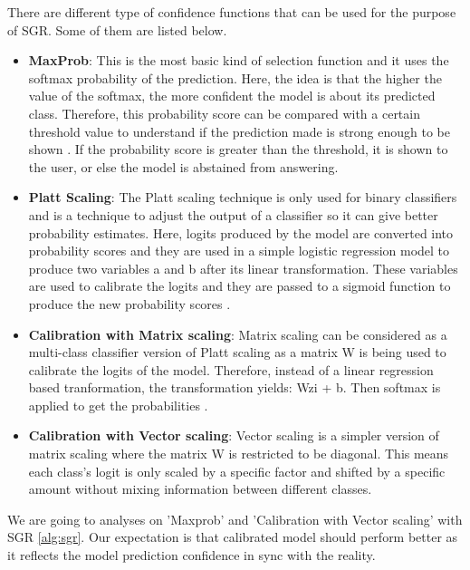\documentclass[
	english,
	accentcolor=8b,
	type=intern,
	marginpar=false
	]{tudapub}
\begin{document}
There are different type of confidence functions that can be used for the purpose of SGR. Some of them are listed below. \par
\begin{itemize}
  \item \textbf{MaxProb}: This is the most basic kind of selection function and it uses the softmax probability of the prediction. Here, the idea is that the higher the value of the softmax, the more confident the model is about its predicted class. Therefore, this probability score can be compared with a certain threshold value to understand if the prediction made is strong enough to be shown \cite{whitehead2022reliablevisualquestionanswering}. If the probability score is greater than the threshold, it is shown to the user, or else the model is abstained from answering.
  \item \textbf{Platt Scaling}: The Platt scaling technique is only used for binary classifiers and is a technique to adjust the output of a classifier so it can give better probability estimates. Here, logits produced by the model are converted into probability scores and they are used in a simple logistic regression model to produce two variables a and b after its linear transformation. These variables are used to calibrate the logits and they are passed to a sigmoid function to produce the new probability scores \cite{guo2017calibrationmodernneuralnetworks}\cite{article}. 
  \item \textbf{Calibration with Matrix scaling}: Matrix scaling can be considered as a multi-class classifier version of Platt scaling as a matrix W is being used to calibrate the logits of the model. Therefore, instead of a linear regression based tranformation, the transformation yields: Wzi + b. Then softmax is applied to get the probabilities \cite{guo2017calibrationmodernneuralnetworks}.
  \item \textbf{Calibration with Vector scaling}: Vector scaling is a simpler version of matrix scaling where the matrix W is restricted to be diagonal. This means each class's logit is only scaled by a specific factor and shifted by a specific amount without mixing information between different classes\cite{guo2017calibrationmodernneuralnetworks}.
\end{itemize}
We are going to analyses on 'Maxprob' and 'Calibration with Vector scaling' with SGR \ref{alg:sgr}. Our expectation is that calibrated model should perform better as it reflects the model prediction confidence in sync with the reality.
 
\end{document}
